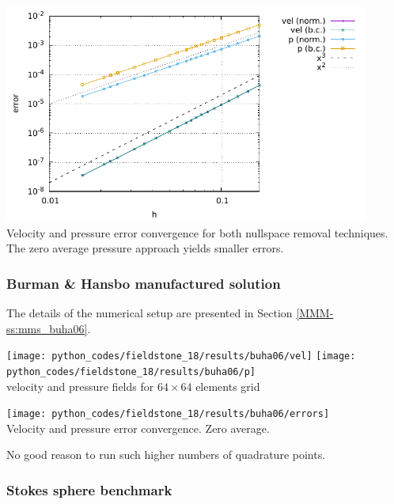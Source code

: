 \begin{center}
\includegraphics[width=12cm]{python_codes/fieldstone_18/results/mms/errors}\\
{\captionfont Velocity and pressure error convergence for both nullspace removal 
techniques. The zero average pressure approach yields smaller errors.}
\end{center}


\subsubsection*{Burman \& Hansbo manufactured solution}

The details of the numerical setup are presented in Section \ref{MMM-ss:mms_buha06}.

\begin{center}
\texttt{[image: python\_codes/fieldstone\_18/results/buha06/vel]}
\texttt{[image: python\_codes/fieldstone\_18/results/buha06/p]}\\
{\captionfont velocity and pressure fields for $64\times 64$ elements grid}
\end{center}

\begin{center}
\texttt{[image: python\_codes/fieldstone\_18/results/buha06/errors]}\\
{\captionfont Velocity and pressure error convergence. Zero average.}
\end{center}

No good reason to run such higher numbers of quadrature points.


\subsubsection*{Stokes sphere benchmark}

